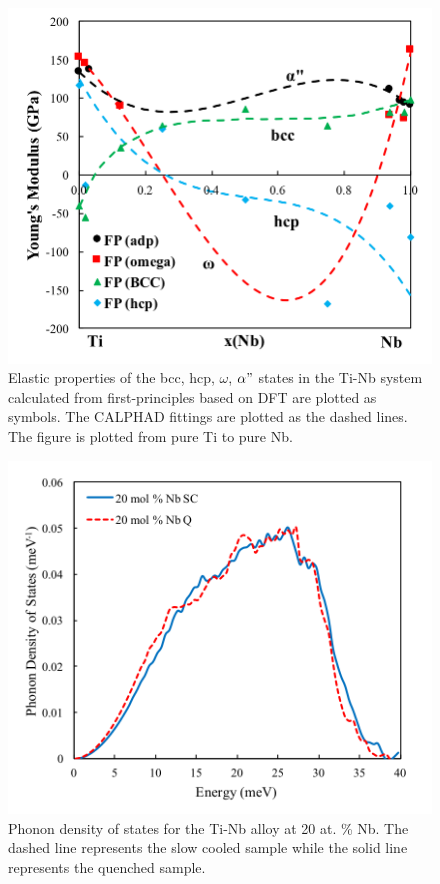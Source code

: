\pagebreak
\begin{figure}[H]
	\centering
	\includegraphics[width=\textwidth]{Chapter-7/Figures/tinbelastic.png}
	\caption{Elastic properties of the bcc, hcp, $\omega$, $\alpha"$ states in the Ti-Nb system calculated from first-principles based on DFT are plotted as symbols. The CALPHAD fittings are plotted as the dashed lines. The figure is plotted from pure Ti to pure Nb.}
	\label{Ch7-figure:tinbelastic}
\end{figure}

\pagebreak
\begin{figure}[H]
	\centering
	\includegraphics[width=\textwidth]{Chapter-7/Figures/50dos20.png}
	\caption{Phonon density of states for the Ti-Nb alloy at 20 at. \% Nb. The dashed line represents the slow cooled sample while the solid line represents the quenched sample.}
	\label{Ch7-figure:50dos20}
\end{figure}

